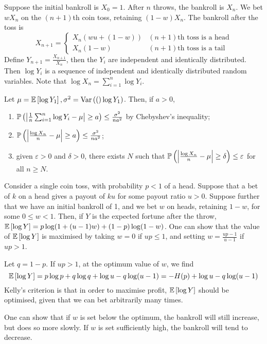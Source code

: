 Suppose the initial bankroll is \( X_0 = 1 \).
After \( n \) throws, the bankroll is \( X_n \).
We bet \( w X_n \) on the \( (n + 1) \)th coin toss, retaining \( (1-w)X_n \).
The bankroll after the toss is
\[ X_{n+1} = \begin{cases}
    X_n(wu + (1-w)) & (n + 1)\text{th toss is a head} \\
    X_n(1-w) & (n + 1)\text{th toss is a tail}
\end{cases} \]
Define \( Y_{n+1} = \frac{X_{n+1}}{X_n} \), then the \( Y_i \) are independent and identically distributed.
Then \( \log Y_i \) is a sequence of independent and identically distributed random variables.
Note that \( \log X_n = \sum_{i=1}^n \log Y_i \).
\begin{lemma}
    Let \( \mu = \mathbb{E}\left[{\log Y_1}\right], \sigma^2 = \operatorname{Var}\left({(}\right)\log Y_1) \).
    Then, if \( a > 0 \),
    \begin{enumerate}
        \item \( \mathbb{P}\left({\abs{\frac{1}{n} \sum_{i=1}^n \log Y_i - \mu} \geq a}\right) \leq \frac{\sigma^2}{na^2} \) by Chebyshev's inequality;
        \item \( \mathbb{P}\left({\abs{\frac{\log X_n}{n} - \mu} \geq a}\right) \leq \frac{\sigma^2}{na^2} \);
        \item given \( \varepsilon > 0 \) and \( \delta > 0 \), there exists \( N \) such that \( \mathbb{P}\left({\abs{\frac{\log X_n}{n} - \mu} \geq \delta}\right) \leq \varepsilon \) for all \( n \geq N \).
    \end{enumerate}
\end{lemma}
Consider a single coin toss, with probability \( p < 1 \) of a head.
Suppose that a bet of \( k \) on a head gives a payout of \( ku \) for some payout ratio \( u > 0 \).
Suppose further that we have an initial bankroll of 1, and we bet \( w \) on heads, retaining \( 1 - w \), for some \( 0 \leq w < 1 \).
Then, if \( Y \) is the expected fortune after the throw, \( \mathbb{E}\left[{\log Y}\right] = p \log(1 + (u-1)w) + (1-p) \log(1-w) \).
One can show that the value of \( \mathbb{E}\left[{\log Y}\right] \) is maximised by taking \( w = 0 \) if \( up \leq 1 \), and setting \( w = \frac{up-1}{u-1} \) if \( up > 1 \).

Let \( q = 1-p \).
If \( up > 1 \), at the optimum value of \( w \), we find
\[ \mathbb{E}\left[{\log Y}\right] = p \log p + q \log q + \log u - q \log(u-1) = -H(p) + \log u - q \log(u-1) \]
Kelly's criterion is that in order to maximise profit, \( \mathbb{E}\left[{\log Y}\right] \) should be optimised, given that we can bet arbitrarily many times.

One can show that if \( w \) is set below the optimum, the bankroll will still increase, but does so more slowly.
If \( w \) is set sufficiently high, the bankroll will tend to decrease.
